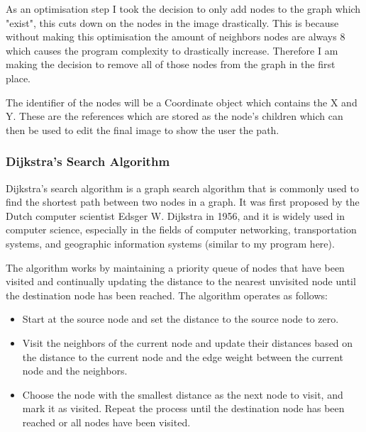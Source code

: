 \begin{FlushLeft}
    As an optimisation step I took the decision to only add nodes to the graph which "exist", this cuts down on the nodes in the image drastically. This is because without making this optimisation the amount of neighbors nodes are always 8 which causes the program complexity to drastically increase. Therefore I am making the decision to remove all of those nodes from the graph in the first place. \\ \bk

    The identifier of the nodes will be a Coordinate object which contains the X and Y. These are the references which are stored as the node's children which can then be used to edit the final image to show the user the path.
    \bk

    \subsubsection{Dijkstra's Search Algorithm}
    Dijkstra's search algorithm is a graph search algorithm that is commonly used to find the shortest path between two nodes in a graph. It was first proposed by the Dutch computer scientist Edsger W. Dijkstra in 1956, and it is widely used in computer science, especially in the fields of computer networking, transportation systems, and geographic information systems (similar to my program here). \\ \bk

    The algorithm works by maintaining a priority queue of nodes that have been visited and continually updating the distance to the nearest unvisited node until the destination node has been reached. The algorithm operates as follows:\\

    \begin{itemize}
    \item Start at the source node and set the distance to the source node to zero.

    \item Visit the neighbors of the current node and update their distances based on the distance to the current node and the edge weight between the current node and the neighbors.

    \item Choose the node with the smallest distance as the next node to visit, and mark it as visited. Repeat the process until the destination node has been reached or all nodes have been visited.
    \end{itemize}


\end{FlushLeft}
